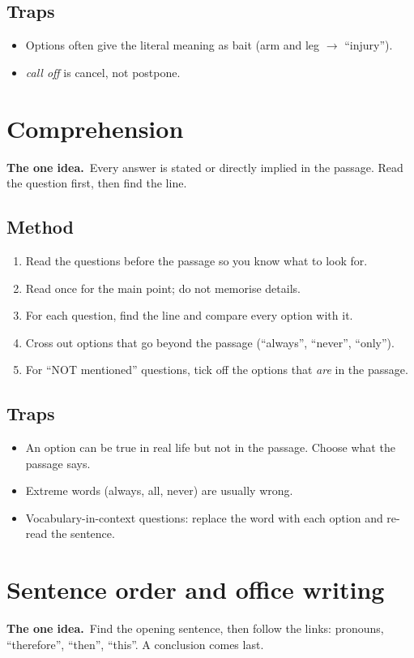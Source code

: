 \documentclass[11pt,a4paper]{article}
\let\oldsection\section
\renewcommand{\section}{\clearpage\oldsection}
\newcommand{\oneidea}[1]{\par\medskip\noindent\begingroup\setlength{\fboxsep}{7pt}%
  \colorbox{codebg}{\parbox{\dimexpr\linewidth-14pt\relax}{\textbf{\color{ember}The one idea.}\ #1}}\endgroup\par\medskip}
\begin{document}
\subsection*{Traps}
\begin{itemize}
\item Options often give the literal meaning as bait (arm and leg $\rightarrow$ ``injury'').
\item \emph{call off} is cancel, not postpone.
\end{itemize}

\section{Comprehension}
\oneidea{Every answer is stated or directly implied in the passage. Read the question first, then find the line.}
\subsection*{Method}
\begin{enumerate}
\item Read the questions before the passage so you know what to look for.
\item Read once for the main point; do not memorise details.
\item For each question, find the line and compare every option with it.
\item Cross out options that go beyond the passage (``always'', ``never'', ``only'').
\item For ``NOT mentioned'' questions, tick off the options that \emph{are} in the passage.
\end{enumerate}
\subsection*{Traps}
\begin{itemize}
\item An option can be true in real life but not in the passage. Choose what the passage says.
\item Extreme words (always, all, never) are usually wrong.
\item Vocabulary-in-context questions: replace the word with each option and re-read the sentence.
\end{itemize}

\section{Sentence order and office writing}
\oneidea{Find the opening sentence, then follow the links: pronouns, ``therefore'', ``then'', ``this''. A conclusion comes last.}
\end{document}
